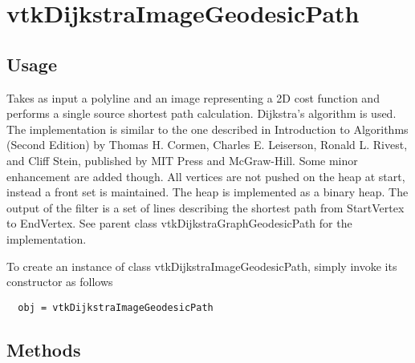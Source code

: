 \section{vtkDijkstraImageGeodesicPath}

\subsection{Usage}

 Takes as input a polyline and an image representing a 2D cost function
 and performs a single source shortest path calculation. 
 Dijkstra's algorithm is used. The implementation is 
 similar to the one described in Introduction to Algorithms (Second Edition)
 by Thomas H. Cormen, Charles E. Leiserson, Ronald L. Rivest, and 
 Cliff Stein, published by MIT Press and McGraw-Hill. Some minor 
 enhancement are added though. All vertices are not pushed on the heap
 at start, instead a front set is maintained. The heap is implemented as 
 a binary heap. The output of the filter is a set of lines describing 
 the shortest path from StartVertex to EndVertex.  See parent class
 vtkDijkstraGraphGeodesicPath for the implementation.


To create an instance of class vtkDijkstraImageGeodesicPath, simply
invoke its constructor as follows
\begin{verbatim}
  obj = vtkDijkstraImageGeodesicPath
\end{verbatim}
\subsection{Methods}

